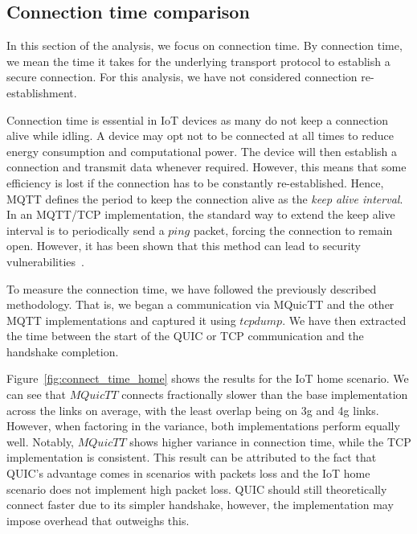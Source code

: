 \subsection{Connection time comparison} \label{sec:conn_time}

In this section of the analysis, we focus on connection time.
By connection time, we mean the time it takes for the underlying transport protocol to establish a secure connection.
For this analysis, we have not considered connection re-establishment.

Connection time is essential in IoT devices as many do not keep a connection alive while idling.
A device may opt not to be connected at all times to reduce energy consumption and computational power.
The device will then establish a connection and transmit data whenever required.
However, this means that some efficiency is lost if the connection has to be constantly re-established.
Hence, MQTT defines the period to keep the connection alive as the \textit{keep alive interval}.
In an MQTT/TCP implementation, the standard way to extend the keep alive interval is to periodically send a $ping$ packet, forcing the connection to remain open.
However, it has been shown that this method can lead to security vulnerabilities~\citep{vaccari_slowtt_2020,mileva_comprehensive_2021}.

To measure the connection time, we have followed the previously described methodology.
That is, we began a communication via MQuicTT and the other MQTT implementations and captured it using $tcpdump$.
We have then extracted the time between the start of the QUIC or TCP communication and the handshake completion.

Figure~\ref{fig:connect_time_home} shows the results for the IoT home scenario.
We can see that $MQuicTT$ connects fractionally slower than the base implementation across the links on average, with the least overlap being on 3g and 4g links.
However, when factoring in the variance, both implementations perform equally well.
Notably, $MQuicTT$ shows higher variance in connection time, while the TCP implementation is consistent.
This result can be attributed to the fact that QUIC's advantage comes in scenarios with packets loss and the IoT home scenario does not implement high packet loss.
QUIC should still theoretically connect faster due to its simpler handshake, however, the implementation may impose overhead that outweighs this.

